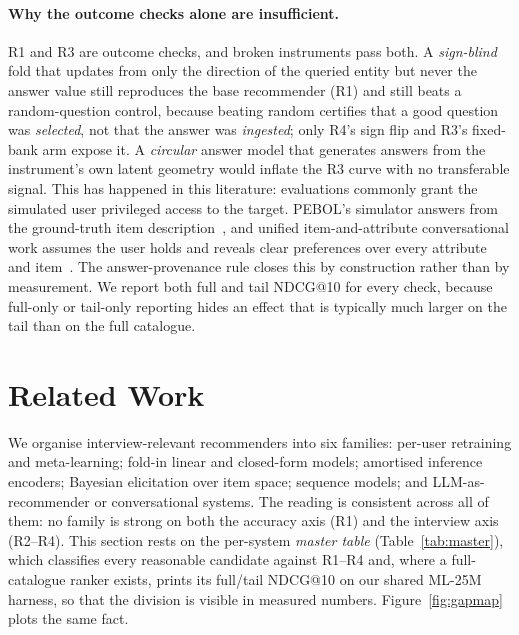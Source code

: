 \documentclass[manuscript,screen,review]{acmart}
\begin{document}
\paragraph{Why the outcome checks alone are insufficient.} R1 and R3 are outcome checks, and broken instruments pass both. A \emph{sign-blind} fold that updates from only the direction of the queried entity but never the answer value still reproduces the base recommender (R1) and still beats a random-question control, because beating random certifies that a good question was \emph{selected}, not that the answer was \emph{ingested}; only R4's sign flip and R3's fixed-bank arm expose it. A \emph{circular} answer model that generates answers from the instrument's own latent geometry would inflate the R3 curve with no transferable signal. This has happened in this literature: evaluations commonly grant the simulated user privileged access to the target. PEBOL's simulator answers from the ground-truth item description~\citep{austin2024bayesian}, and unified item-and-attribute conversational work assumes the user holds and reveals clear preferences over every attribute and item~\citep{deng2021unicorn}. The answer-provenance rule closes this by construction rather than by measurement. We report both full and tail NDCG@10 for every check, because full-only or tail-only reporting hides an effect that is typically much larger on the tail than on the full catalogue.

\section{Related Work}\label{sec:related}

We organise interview-relevant recommenders into six families: per-user retraining and meta-learning; fold-in linear and closed-form models; amortised inference encoders; Bayesian elicitation over item space; sequence models; and LLM-as-recommender or conversational systems. The reading is consistent across all of them: no family is strong on both the accuracy axis (R1) and the interview axis (R2--R4). This section rests on the per-system \emph{master table} (Table~\ref{tab:master}), which classifies every reasonable candidate against R1--R4 and, where a full-catalogue ranker exists, prints its full/tail NDCG@10 on our shared ML-25M harness, so that the division is visible in measured numbers. Figure~\ref{fig:gapmap} plots the same fact.
\end{document}
